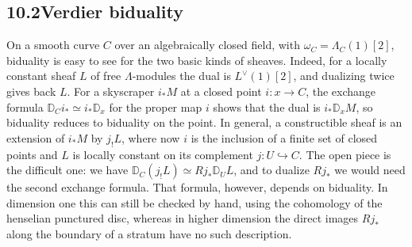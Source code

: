 \documentclass[11pt]{article}
\begin{document}
\subsection*{\texorpdfstring{10.2\quad Verdier biduality}{10.2 Verdier biduality}}
\label{bp12}%
\label{bp13}%
On a smooth curve \(C\) over an algebraically closed field, with \(\omega_C=\Lambda_C(1)[2]\), biduality is easy to see for the two basic kinds of sheaves. Indeed, for a locally constant sheaf \(L\) of free \(\Lambda\)-modules the dual is \(L^\vee(1)[2]\), and dualizing twice gives back \(L\). For a skyscraper \(i_*M\) at a closed point \(i:x\to C\), the exchange formula \(\mathbb D_Ci_*\simeq i_*\mathbb D_x\) for the proper map \(i\) shows that the dual is \(i_*\mathbb D_xM\), so biduality reduces to biduality on the point. In general, a constructible sheaf is an extension of \(i_*M\) by \(j_!L\), where now \(i\) is the inclusion of a finite set of closed points and \(L\) is locally constant on its complement \(j:U\hookrightarrow C\). The open piece is the difficult one: we have \(\mathbb D_C(j_!L)\simeq Rj_*\mathbb D_UL\), and to dualize \(Rj_*\) we would need the second exchange formula. That formula, however, depends on biduality. In dimension one this can still be checked by hand, using the cohomology of the henselian punctured disc, whereas in higher dimension the direct images \(Rj_*\) along the boundary of a stratum have no such description.
\end{document}

